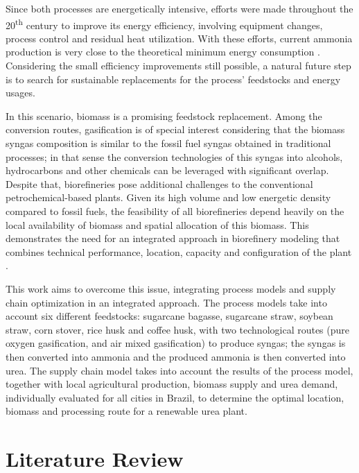 \documentclass[a4paper, titlepage]{article}
\begin{document}
Since both processes are energetically intensive, efforts were made throughout the 20\textsuperscript{th} century to
improve its energy efficiency, involving equipment changes, process control and residual heat utilization. With these
efforts, current ammonia production is very close to the theoretical minimum energy consumption
\cite{ieaAmmoniaTechnologyRoadmap2021}. Considering the small efficiency improvements still possible, a natural future
step is to search for sustainable replacements for the process’ feedstocks and energy usages.

In this scenario, biomass is a promising feedstock replacement. Among the conversion routes, gasification is of special
interest considering that the biomass syngas composition is similar to the fossil fuel syngas obtained in traditional
processes; in that sense the conversion technologies of this syngas into alcohols, hydrocarbons and other chemicals can
be leveraged with significant overlap. Despite that, biorefineries pose additional challenges to the conventional
petrochemical-based plants. Given its high volume and low energetic density compared to fossil fuels, the feasibility of
all biorefineries depend heavily on the local availability of biomass and spatial allocation of this biomass. This
demonstrates the need for an integrated approach in biorefinery modeling that combines technical performance, location,
capacity and configuration of the plant \cite{schroderImprovingBiorefineryPlanning2018}.

This work aims to overcome this issue, integrating process models and supply chain optimization in an integrated
approach. The process models take into account six different feedstocks: sugarcane bagasse, sugarcane straw, soybean
straw, corn stover, rice husk and coffee husk, with two technological routes (pure oxygen gasification, and air mixed
gasification) to produce syngas; the syngas is then converted into ammonia and the produced ammonia is then converted
into urea. The supply chain model takes into account the results of the process model, together with local agricultural
production, biomass supply and urea demand, individually evaluated for all cities in Brazil, to determine the optimal
location, biomass and processing route for a renewable urea plant.

\section{Literature Review}
\end{document}
